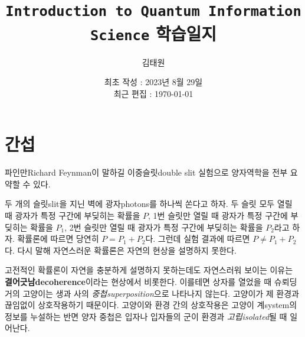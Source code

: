 \documentclass[a4paper,chapter,atbegshi]{oblivoir}
\title{\texttt{Introduction to Quantum Information Science} 학습일지}
\author{김태원}
\date{최초 작성 : 2023년 8월 29일 \\ 최근 편집 : \today}
\begin{document}
\maketitle
\break
\tableofcontents
\chapter{간섭}
파인만{\tiny Richard Feynman}이 말하길 이중슬릿{\tiny double slit} 실험으로
양자역학을 전부 요약할 수 있다.

두 개의 슬릿{\tiny slit}을 지닌 벽에 광자{\tiny photons}를 하나씩 쏜다고 하자.
두 슬릿 모두 열릴 때 광자가 특정 구간에 부딪히는 확률을 $P$, 1번 슬릿만
열릴 때 광자가 특정 구간에 부딪히는 확률을 $P_1$, 2번 슬릿만 열릴 때 광자가
특정 구간에 부딪히는 확률을 $P_2$라고 하자. 확률론에 따르면 당연히 $P=P_1+P_2$다.
그런데 실험 결과에 따르면 $P\neq P_1+P_2$다. 다시 말해 자연스러운 확률론은 자연의 
현상을 설명하지 못한다.

고전적인 확률론이 자연을 충분하게 설명하지 못하는데도 자연스러워 보이는 이유는 
\textbf{결어긋남\tiny decoherence}이라는 현상에서 비롯한다. 이를테면 상자를
열었을 때 슈뢰딩거의 고양이는 생과 사의 \emph{중첩\tiny superposition}으로
나타나지 않는다. 고양이가 제 환경과 끊임없이 상호작용하기 때문이다. 고양이와
환경 간의 상호작용은 고양이 계{\tiny system}의 정보를 누설하는 반면 양자
중첩은 입자나 입자들의 군이 환경과 \emph{고립\tiny isolated}될 때 일어난다.
\end{document}
